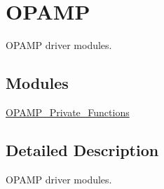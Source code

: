 \hypertarget{group___o_p_a_m_p}{\section{O\-P\-A\-M\-P}
\label{group___o_p_a_m_p}
}


O\-P\-A\-M\-P driver modules.  


\subsection*{Modules}
\begin{DoxyCompactItemize}
\item 
\hyperlink{group___o_p_a_m_p___private___functions}{O\-P\-A\-M\-P\-\_\-\-Private\-\_\-\-Functions}
\end{DoxyCompactItemize}


\subsection{Detailed Description}
O\-P\-A\-M\-P driver modules. 